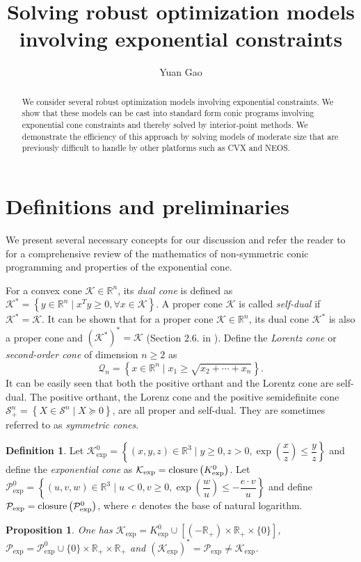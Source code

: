 \documentclass[10pt]{article}
\title{Solving robust optimization models involving exponential constraints}
\author{Yuan Gao}
\theoremstyle{definition}
\newtheorem{defin}{Definition}
\theoremstyle{plain}
\newtheorem{prop}{Proposition}
\begin{document}
\maketitle

\begin{abstract}
We consider several robust optimization models involving exponential constraints. We show that these models can be cast into standard form conic programs involving exponential cone constraints and thereby solved by interior-point methods. We demonstrate the efficiency of this approach by solving models of moderate size that are previously difficult to handle by other platforms such as CVX and NEOS.
\end{abstract}

\section{Definitions and preliminaries}
We present several necessary concepts for our discussion and refer the reader to \cite{Robert_thesis} for a comprehensive review of the mathematics of non-symmetric conic programming and properties of the exponential cone. 

For a convex cone $\mathcal{K} \in \mathbb{R}^n$, its \textit{dual cone} is defined as 
$\mathcal{K}^* = \left\{y\in \mathbb{R}^n \mid x^T y\geq 0, \forall x \in \mathcal{K} \right\}$. A proper cone $\mathcal{K}$ is called \textit{self-dual} if $\mathcal{K}^* = \mathcal{K}$. It can be shown that for a proper cone $\mathcal{K} \in \mathbb{R}^n$, its dual cone $\mathcal{K}^*$ is also a proper cone and $(\mathcal{K}^*)^* = \mathcal{K}$ (Section 2.6. in \cite{Boyd_Vander_Convex_Opt_Book}). Define the \textit{Lorentz cone} or \textit{second-order cone} of dimension $n\geq 2$ as
\[\mathcal{Q}_n = \left\{ x \in \mathbb{R}^n \mid x_1 \geq \sqrt{x_2+\cdots+x_n} \right\}.\]
It can be easily seen that both the positive orthant and the Lorentz cone are self-dual. The positive orthant, the Lorenz cone and the positive semidefinite cone $\mathcal{S}^n_+ = \left\{ X \in \mathcal{S}^{n} \mid X\succeq 0 \right\}$, are all proper and self-dual. They are sometimes referred to as \textit{symmetric cones}.
\begin{defin}
	Let $\mathcal{K}^0_{\exp} = \left\{(x, y, z) \in \mathbb{R}^3 \mid y \geq 0, z > 0, \exp\left(\dfrac{x}{z}\right) \leq \dfrac{y}{z}\right\}$
	and define the \textit{exponential cone} as
	$\mathcal{K}_{\exp} = \textnormal{closure}\left(K^0_{\exp}\right)$. Let $\mathcal{P}^0_{\exp} = \left\{(u,v,w) \in \mathbb{R}^3 \mid u<0, v \geq 0, \exp\left(\dfrac{w}{u}\right)\leq -\dfrac{e\cdot v}{u} \right\}$
	and define $\mathcal{P}_{\exp} = \textnormal{closure} \left(\mathcal{P}^0_{\exp}\right)$,
	where $e$ denotes the base of natural logarithm. 
\end{defin}
\begin{prop}\label{K_exp=K0_exp_union_something}
	One has $\mathcal{K}_{\exp} = K^0_{\exp} \cup \left[\left(-\mathbb{R}_+\right) \times \mathbb{R}_+ \times \{0\} \right]$, $\mathcal{P}_{\exp} = \mathcal{P}^0_{\exp} \cup \{0\} \times \mathbb{R}_+ \times \mathbb{R}_+$ and $ (\mathcal{K}_{\exp})^* = \mathcal{P}_{\exp} \neq \mathcal{K}_{\exp}$.
\end{prop}
\end{document}
